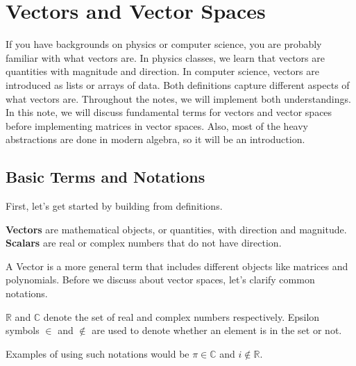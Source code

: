 \documentclass[../main.tex]{subfiles}
\begin{document}
\chapter{Vectors and Vector Spaces}

If you have backgrounds on physics or computer science, you are
probably familiar with what vectors are. In physics classes,
we learn that vectors are quantities with magnitude and direction.
In computer science, vectors are introduced as lists or arrays of
data. Both definitions capture different aspects of what vectors
are. Throughout the notes, we will implement both understandings.
In this note, we will discuss fundamental terms for vectors and
vector spaces before implementing matrices in vector spaces.
Also, most of the heavy abstractions are done in modern algebra,
so it will be an introduction.

\section{Basic Terms and Notations}

First, let's get started by building from definitions.

\begin{definition}
\textbf{Vectors} are mathematical objects, or quantities, with
direction and magnitude. \textbf{Scalars} are real or complex
numbers that do not have direction.
\end{definition}

A Vector is a more general term that includes different objects like
matrices and polynomials. Before we discuss about vector spaces,
let's clarify common notations.

\begin{definition}
$\mathbb{R}$ and $\mathbb{C}$ denote the set of real and complex
numbers respectively. Epsilon symbols $\in$ and $\notin$ are used to
denote whether an element is in the set or not.
\end{definition}

Examples of using such notations would be $\pi \in \mathbb{C}$
and $i \notin \mathbb{R}$.
\end{document}

